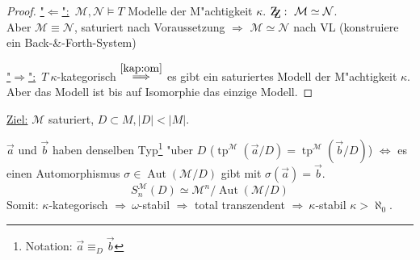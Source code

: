\documentclass[a4paper,12pt,numbers=noenddot,parskip=full]{scrartcl}
\newcommand{\scrM}{\mathcal{M}}
\newcommand{\scrN}{\mathcal{N}}
\newcommand{\zz}{\mathrm{Z\kern-.3em\raise-0.5ex\hbox{Z}}:~}
\newcommand{\hin}{\underline{"$\Rightarrow$":}~}
\newcommand{\rueck}{\underline{"$\Leftarrow$":}~}
\DeclareMathOperator{\au}{Aut}
\DeclareMathOperator{\typ}{tp}
\theoremstyle{dotless}
\begin{document}
\begin{proof}
	\rueck $\scrM, \scrN \models T$ Modelle der M"achtigkeit $\kappa$. $\zz \scrM \simeq \scrN$.\\
	Aber $\scrM \equiv \scrN$, saturiert nach Voraussetzung $\Rightarrow$ $\scrM \simeq \scrN$ nach VL (konstruiere ein Back-\&-Forth-System)%
	
	\hin $T~\kappa$-kategorisch $\overset{\eqref{kap:om}}{\Longrightarrow}$ es gibt ein saturiertes Modell der M"achtigkeit $\kappa$. Aber das Modell ist bis auf Isomorphie das einzige Modell.
\end{proof}
\underline{Ziel:} $\scrM$ saturiert, $D \subset M, |D|<|M|$.

$\vec{a}$ und $\vec{b}$ haben denselben Typ\footnote{Notation: $\vec{a} \equiv_D \vec{b}$} "uber $D$ ($\typ^\scrM\left(\vec{a}/D\right)=\typ^\scrM\left(\vec{b}/D\right)$) $\Longleftrightarrow$ es einen Automorphismus $\sigma \in \au (\scrM/D)$ gibt mit $\sigma(\vec{a})=\vec{b}$.
\begin{equation*}
	S_n^\scrM (D) \simeq \scrM^n / \au(\scrM/D)
\end{equation*}
Somit: $\kappa$-kategorisch $\Rightarrow~ \omega$-stabil $\Rightarrow$ total transzendent $\Rightarrow~ \kappa$-stabil $\kappa>\aleph_0$.
\end{document}
